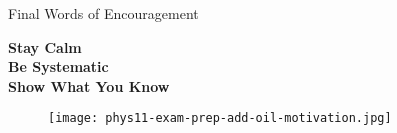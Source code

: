 \documentclass{beamer}
\begin{document}
\begin{frame}{Final Words of Encouragement}
\begin{center}
\Large
\textcolor{ds9gold}{\textbf{Stay Calm}} \\
\textcolor{ds9blue}{\textbf{Be Systematic}} \\
\textcolor{ds9red}{\textbf{Show What You Know}} \\
\end{center}



\begin{figure}
    \centering
    \texttt{[image: phys11-exam-prep-add-oil-motivation.jpg]}
\end{figure}
\end{frame}
\end{document}
